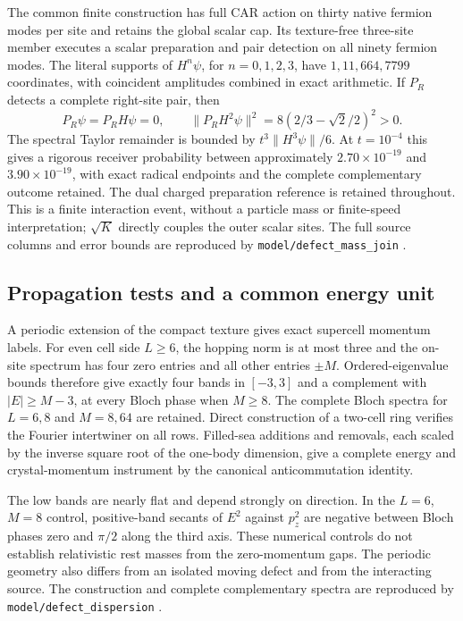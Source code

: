 The common finite construction has full CAR action on thirty native
fermion modes per site and retains the global scalar cap. Its texture-free
three-site member executes a scalar preparation and pair detection on all
ninety fermion modes. The literal supports of $H^n\psi$, for $n=0,1,2,3$,
have $1,11,664,7799$ coordinates, with coincident amplitudes combined in
exact arithmetic. If $P_R$ detects a complete right-site pair, then
\[
 P_R\psi=P_RH\psi=0,\qquad
 \|P_RH^2\psi\|^2=8(2/3-\sqrt2/2)^2>0.
\]
The spectral Taylor remainder is bounded by
$t^3\|H^3\psi\|/6$. At $t=10^{-4}$ this gives a rigorous receiver
probability between approximately $2.70\times10^{-19}$ and
$3.90\times10^{-19}$, with exact radical endpoints and the complete
complementary outcome retained. The dual charged preparation reference
is retained throughout. This is a finite interaction event, without a
particle mass or finite-speed interpretation; $\sqrt K$ directly couples
the outer scalar sites. The full source columns and error bounds are
reproduced by \texttt{model/defect\_mass\_join} \cite{ophrepo}.

\subsection{Propagation tests and a common energy unit}

A periodic extension of the compact texture gives exact supercell momentum
labels. For even cell side $L\ge6$, the hopping norm is at most three and
the on-site spectrum has four zero entries and all other entries $\pm M$.
Ordered-eigenvalue bounds therefore give exactly four bands in $[-3,3]$
and a complement with $|E|\ge M-3$, at every Bloch phase when $M\ge8$.
The complete Bloch spectra for $L=6,8$ and $M=8,64$ are retained. Direct
construction of a two-cell ring verifies the Fourier intertwiner on all
rows. Filled-sea additions and removals, each scaled by the inverse square
root of the one-body dimension, give a complete energy and crystal-momentum
instrument by the canonical anticommutation identity.

The low bands are nearly flat and depend strongly on direction. In the
$L=6$, $M=8$ control, positive-band secants of $E^2$ against $p_z^2$ are
negative between Bloch phases zero and $\pi/2$ along the third axis.
These numerical controls do not
establish relativistic rest masses from the zero-momentum gaps. The
periodic geometry also differs from an isolated moving defect and from
the interacting source. The construction and complete complementary
spectra are reproduced by \texttt{model/defect\_dispersion} \cite{ophrepo}.

